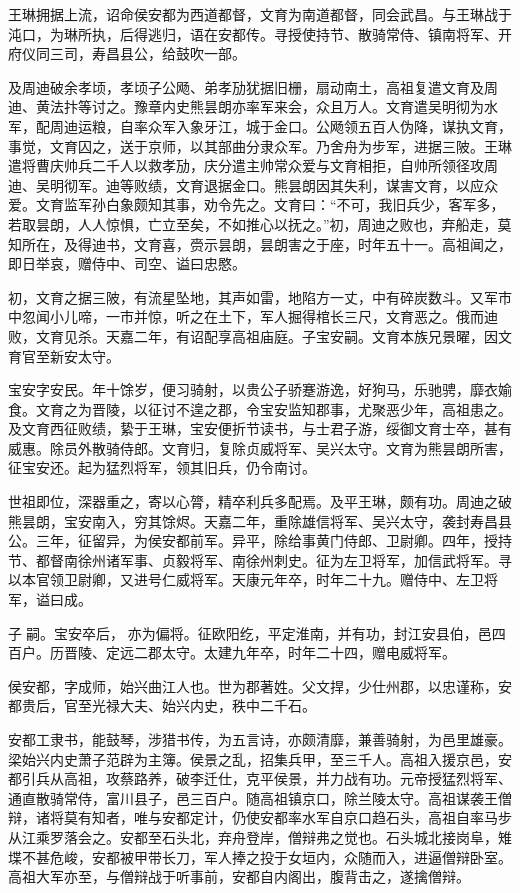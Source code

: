 \documentclass[]{article}
\begin{document}
王琳拥据上流，诏命侯安都为西道都督，文育为南道都督，同会武昌。与王琳战于沌口，为琳所执，后得逃归，语在安都传。寻授使持节、散骑常侍、镇南将军、开府仪同三司，寿昌县公，给鼓吹一部。

及周迪破余孝顷，孝顷子公飏、弟孝劢犹据旧栅，扇动南土，高祖复遣文育及周迪、黄法抃等讨之。豫章内史熊昙朗亦率军来会，众且万人。文育遣吴明彻为水军，配周迪运粮，自率众军入象牙江，城于金口。公飏领五百人伪降，谋执文育，事觉，文育囚之，送于京师，以其部曲分隶众军。乃舍舟为步军，进据三陂。王琳遣将曹庆帅兵二千人以救孝劢，庆分遣主帅常众爱与文育相拒，自帅所领径攻周迪、吴明彻军。迪等败绩，文育退据金口。熊昙朗因其失利，谋害文育，以应众爱。文育监军孙白象颇知其事，劝令先之。文育曰：``不可，我旧兵少，客军多，若取昙朗，人人惊惧，亡立至矣，不如推心以抚之。''初，周迪之败也，弃船走，莫知所在，及得迪书，文育喜，赍示昙朗，昙朗害之于座，时年五十一。高祖闻之，即日举哀，赠侍中、司空、谥曰忠愍。

初，文育之据三陂，有流星坠地，其声如雷，地陷方一丈，中有碎炭数斗。又军市中忽闻小儿啼，一市并惊，听之在土下，军人掘得棺长三尺，文育恶之。俄而迪败，文育见杀。天嘉二年，有诏配享高祖庙庭。子宝安嗣。文育本族兄景曜，因文育官至新安太守。

宝安字安民。年十馀岁，便习骑射，以贵公子骄蹇游逸，好狗马，乐驰骋，靡衣媮食。文育之为晋陵，以征讨不遑之郡，令宝安监知郡事，尤聚恶少年，高祖患之。及文育西征败绩，絷于王琳，宝安便折节读书，与士君子游，绥御文育士卒，甚有威惠。除员外散骑侍郎。文育归，复除贞威将军、吴兴太守。文育为熊昙朗所害，征宝安还。起为猛烈将军，领其旧兵，仍令南讨。

世祖即位，深器重之，寄以心膂，精卒利兵多配焉。及平王琳，颇有功。周迪之破熊昙朗，宝安南入，穷其馀烬。天嘉二年，重除雄信将军、吴兴太守，袭封寿昌县公。三年，征留异，为侯安都前军。异平，除给事黄门侍郎、卫尉卿。四年，授持节、都督南徐州诸军事、贞毅将军、南徐州刺史。征为左卫将军，加信武将军。寻以本官领卫尉卿，又进号仁威将军。天康元年卒，时年二十九。赠侍中、左卫将军，谥曰成。

子嗣。宝安卒后，亦为偏将。征欧阳纥，平定淮南，并有功，封江安县伯，邑四百户。历晋陵、定远二郡太守。太建九年卒，时年二十四，赠电威将军。

侯安都，字成师，始兴曲江人也。世为郡著姓。父文捍，少仕州郡，以忠谨称，安都贵后，官至光禄大夫、始兴内史，秩中二千石。

安都工隶书，能鼓琴，涉猎书传，为五言诗，亦颇清靡，兼善骑射，为邑里雄豪。梁始兴内史萧子范辟为主簿。侯景之乱，招集兵甲，至三千人。高祖入援京邑，安都引兵从高祖，攻蔡路养，破李迁仕，克平侯景，并力战有功。元帝授猛烈将军、通直散骑常侍，富川县子，邑三百户。随高祖镇京口，除兰陵太守。高祖谋袭王僧辩，诸将莫有知者，唯与安都定计，仍使安都率水军自京口趋石头，高祖自率马步从江乘罗落会之。安都至石头北，弃舟登岸，僧辩弗之觉也。石头城北接岗阜，雉堞不甚危峻，安都被甲带长刀，军人捧之投于女垣内，众随而入，进逼僧辩卧室。高祖大军亦至，与僧辩战于听事前，安都自内阁出，腹背击之，遂擒僧辩。
\end{document}
